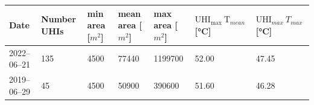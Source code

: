 \documentclass[12pt,a4paper, english,twoside]{article}
\begin{document}
\begin{landscape}
\begin{table}[ht]
\begin{tabular}{l lll lll}
        \textbf{Date}& Number UHIs & min area [$m^2$]& mean area [$m^2$]& max area [$m^2$]& $\text{UHI}_{\text{max}}~\text{T}_{mean}$ [°C]& $\text{UHI}_{max}~T_{max}$ [°C]\\
             \midrule
        2022--06--21 & 135 & 4500 & 77440 & 1199700 &52.00 & 47.45 \\ 
        2019--06--29 &  45 & 4500 & 50900 &  390600 & 51.60 & 46.28  \\
        \bottomrule
      \end{tabular}
    \end{table}

\end{landscape}
  
\end{document}

